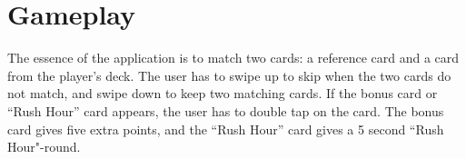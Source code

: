 \section{Gameplay}
The essence of the application is to match two cards: a reference card and a card from the player's deck. The user has to swipe up to skip when the two cards do not match, and swipe down to keep two matching cards. If the bonus card or “Rush Hour” card appears, the user has to double tap on the card. The bonus card gives five extra points, and the “Rush Hour” card gives a 5 second “Rush Hour"-round.